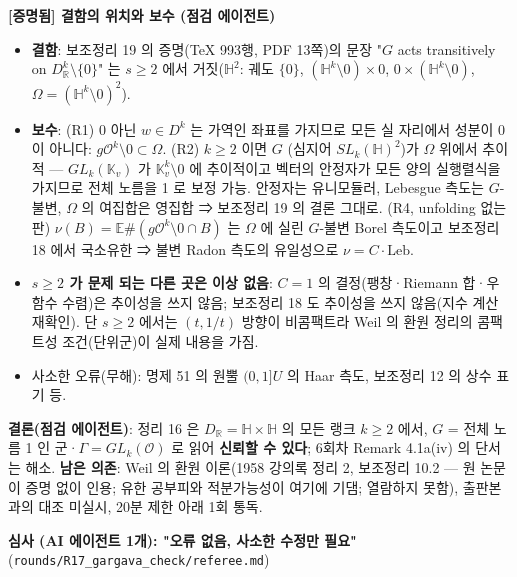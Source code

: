 \textbf{{[}증명됨{]} 결함의 위치와 보수 (점검 에이전트)}

\begin{itemize}
\tightlist
\item
  \textbf{결함}: 보조정리 19 의 증명(TeX 993행, PDF 13쪽)의 문장 "\(G\) acts transitively on \(D_\mathbb R^k\setminus\{0\}\)" 는 \(s\ge2\) 에서 거짓(\(\mathbb H^2\): 궤도 \(\{0\}\), \((\mathbb H^k\setminus0)\times0\), \(0\times(\mathbb H^k\setminus0)\), \(\Omega=(\mathbb H^k\setminus0)^2\)).
\item
  \textbf{보수}: (R1) 0 아닌 \(w\in D^k\) 는 가역인 좌표를 가지므로 모든 실 자리에서 성분이 0 이 아니다: \(g\mathcal O^k\setminus0\subset\Omega\). (R2) \(k\ge2\) 이면 \(G\) (심지어 \(SL_k(\mathbb H)^2\))가 \(\Omega\) 위에서 추이적 --- \(GL_k(\mathbb K_v)\) 가 \(\mathbb K_v^k\setminus0\) 에 추이적이고 벡터의 안정자가 모든 양의 실행렬식을 가지므로 전체 노름을 1 로 보정 가능. 안정자는 유니모듈러, Lebesgue 측도는 \(G\)-불변, \(\Omega\) 의 여집합은 영집합 ⇒ 보조정리 19 의 결론 그대로. (R4, unfolding 없는 판) \(\nu(B)=\mathbb E\#(g\mathcal O^k\setminus0\cap B)\) 는 \(\Omega\) 에 실린 \(G\)-불변 Borel 측도이고 보조정리 18 에서 국소유한 ⇒ 불변 Radon 측도의 유일성으로 \(\nu=C\cdot\mathrm{Leb}\).
\item
  \textbf{\(s\ge2\) 가 문제 되는 다른 곳은 이상 없음}: \(C=1\) 의 결정(팽창·Riemann 합·우함수 수렴)은 추이성을 쓰지 않음; 보조정리 18 도 추이성을 쓰지 않음(지수 계산 재확인). 단 \(s\ge2\) 에서는 \((t,1/t)\) 방향이 비콤팩트라 Weil 의 환원 정리의 콤팩트성 조건(단위군)이 실제 내용을 가짐.
\item
  사소한 오류(무해): 명제 51 의 원뿔 \((0,1]U\) 의 Haar 측도, 보조정리 12 의 상수 표기 등.
\end{itemize}

\textbf{결론(점검 에이전트)}: 정리 16 은 \(D_\mathbb R=\mathbb H\times\mathbb H\) 의 모든 랭크 \(k\ge2\) 에서, \(G\) = 전체 노름 1 인 군·\(\Gamma=GL_k(\mathcal O)\) 로 읽어 \textbf{신뢰할 수 있다}; 6회차 Remark 4.1a(iv) 의 단서는 해소. \textbf{남은 의존}: Weil 의 환원 이론(1958 강의록 정리 2, 보조정리 10.2 --- 원 논문이 증명 없이 인용; 유한 공부피와 적분가능성이 여기에 기댐; 열람하지 못함), 출판본과의 대조 미실시, 20분 제한 아래 1회 통독.

\textbf{심사 (AI 에이전트 1개): "오류 없음, 사소한 수정만 필요"} (\texttt{rounds/R17\_gargava\_check/referee.md})


